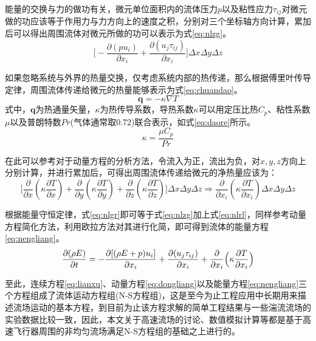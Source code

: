 能量的交换与力的做功有关，微元单位面积内的流体压力$p$以及粘性应力$\tau_{ij}$对微元做的功应该等于作用力与力方向上的速度之积，分别对三个坐标轴方向计算，累加后可以得出周围流体对微元所做的功可以表示为式\eqref{eq:nlzg}。
\begin{equation}
\Big[-\frac{\partial(pu_i)}{\partial x_i}+\frac{\partial(u_j\tau_{ij})}{\partial x_i}\Big]\Delta x\Delta y\Delta z
\label{eq:nlzg}
\end{equation}

如果忽略系统与外界的热量交换，仅考虑系统内部的热传递，那么根据傅里叶传导定律，周围流体传递给微元的热量能够表示为式\eqref{eq:chuandao}。
\begin{equation}
\mathbf{q}=-\kappa\nabla T
\label{eq:chuandao}
\end{equation}
式中，$\mathbf{q}$为热通量矢量，$\kappa$为热传导系数，导热系数$\kappa$可以用定压比热$C_p$、粘性系数$\mu$以及普朗特数$Pr$(气体通常取0.72)联合表示，如式\eqref{eq:daore}所示。
\begin{equation}
\kappa=\frac{\mu C_p}{Pr}
\label{eq:daore}
\end{equation}

在此可以参考对于动量方程的分析方法，令流入为正，流出为负，对$x,y,z$方向上分别计算，并进行累加后，可得出周围流体传递给微元的净热量应该为：
\begin{equation}
\Big[\frac{\partial}{\partial x}(\kappa\frac{\partial T}{\partial x})+\frac{\partial}{\partial y}(\kappa\frac{\partial T}{\partial y})+\frac{\partial}{\partial z}(\kappa\frac{\partial T}{\partial z})\Big]\Delta x\Delta y\Delta z\Rightarrow\frac{\partial}{\partial x_i}(\kappa\frac{\partial T}{\partial x_i})\Delta x\Delta y\Delta z
\label{eq:nlrl}
\end{equation}

根据能量守恒定律，式\eqref{eq:nlgr}即可等于式\eqref{eq:nlzg}加上式\eqref{eq:nlrl}，同样参考动量方程简化方法，利用欧拉方法对其进行化简，即可得到流体的能量方程\eqref{eq:nengliang}。
\begin{equation}
\frac{\partial(\rho E)}{\partial t}=-\frac{\partial[(\rho E+p)u_i]}{\partial x_i}+\frac{\partial(u_j\tau_{ij})}{\partial x_i}+\frac{\partial}{\partial x_i}\Bigl(\kappa\frac{\partial T}{\partial x_i}\Bigr)
\label{eq:nengliang}
\end{equation}

至此，连续方程\eqref{eq:lianxu}、动量方程\eqref{eq:dongliang}以及能量方程\eqref{eq:nengliang}三个方程组成了流体运动方程组(N-S方程组)，这是至今为止工程应用中长期用来描述流场运动的基本方程，到目前为止该方程求解的简单工程结果与一些湍流流场的实验数据比较一致，因此，本文关于高速流场的讨论、数值模拟计算等都是基于高速飞行器周围的非均匀流场满足N-S方程组的基础之上进行的。


